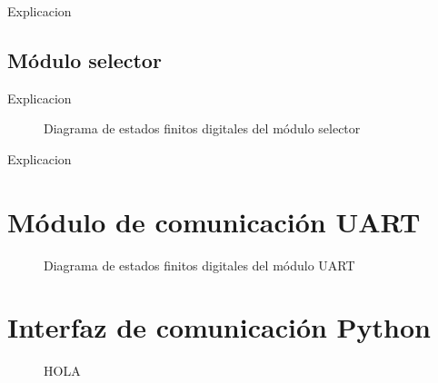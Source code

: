 		Explicacion 
		
	\subsection{Módulo selector}
	
		Explicacion 
		
		\begin{figure}[h]
		\centering
			\caption{Diagrama de estados finitos digitales del módulo selector}
			\label{fig:FSMD_Selector}
		\end{figure}
		
		Explicacion 
		
\section{Módulo de comunicación UART}

		\begin{figure}[h]
		\centering
			\caption{Diagrama de estados finitos digitales del módulo UART}
			\label{fig:FSMD_UART}
		\end{figure}

\section{Interfaz de comunicación Python}

		\begin{figure}[h]
		\centering
			\caption{HOLA}
			\label{fig:hola}
		\end{figure}
